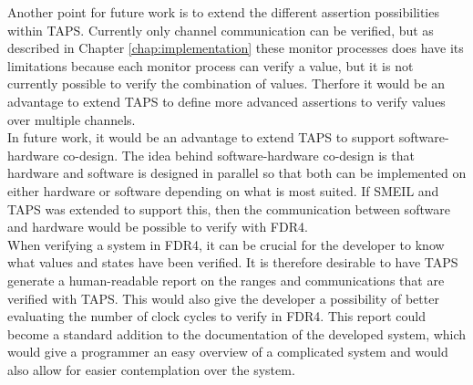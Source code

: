Another point for future work is to extend the different assertion possibilities within TAPS. Currently only channel communication can be verified, but as described in Chapter \ref{chap:implementation} %
these monitor processes does have its limitations because each monitor process can verify a value, but it is not currently possible to verify the combination of values. Therfore it would be an advantage to extend TAPS to define more advanced assertions to verify values over multiple channels. \\

In future work, it would be an advantage to extend TAPS to support software-hardware co-design. The idea behind software-hardware co-design is that hardware and software is designed in parallel so that both can be implemented on either hardware or software depending on what is most suited. If SMEIL and TAPS was extended to support this, then the communication between software and hardware would be possible to verify with FDR4. \\

When verifying a system in FDR4, it can be crucial for the developer to know what values and states have been verified. It is therefore desirable to have TAPS generate a human-readable report on the ranges and communications that are verified with TAPS. This would also give the developer a possibility of better evaluating the number of clock cycles to verify in FDR4.
This report could become a standard addition to the documentation of the developed system, which would give a programmer an easy overview of a complicated system and would also allow for easier contemplation over the system.